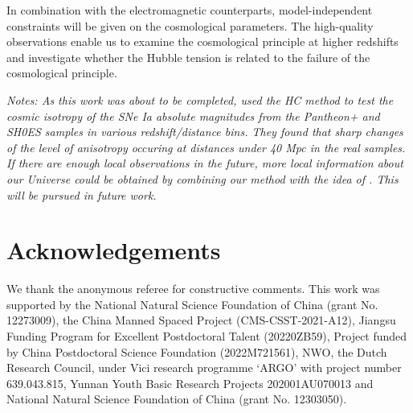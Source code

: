 \documentclass{aa}
\begin{document}
In combination with the electromagnetic counterparts, model-independent constraints will be given on the cosmological parameters. The high-quality observations enable us to examine the cosmological principle at higher redshifts and investigate whether the Hubble tension is related to the failure of the cosmological principle. 

\noindent \emph{\emph{Notes:} \emph{As this work was about to be completed, \citet{2023PhRvD.108f3509P} used the HC method to test the cosmic isotropy of the SNe Ia absolute magnitudes from the Pantheon+ and SH0ES samples in various redshift/distance bins. They found that sharp changes of the level of anisotropy occuring at distances under 40 Mpc in the real samples. If there are enough local observations in the future, more local information about our Universe could be obtained by combining our method with the idea of \citet{2023PhRvD.108f3509P}. This will be pursued in future work.}}



\section*{Acknowledgements}
We thank the anonymous referee for constructive comments. This work was supported by the National Natural Science Foundation of China (grant No. 12273009), the China Manned Spaced Project (CMS-CSST-2021-A12), Jiangsu Funding Program for Excellent Postdoctoral Talent (20220ZB59), Project funded by China Postdoctoral Science Foundation (2022M721561), NWO, the Dutch Research Council, under Vici research programme `ARGO' with project number 639.043.815, Yunnan Youth Basic Research Projects 202001AU070013 and National Natural Science Foundation of China (grant No. 12303050).
\end{document}
